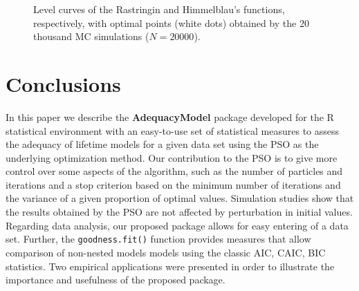 \documentclass[10pt,letterpaper]{article}
\begin{document}
\begin{figure}[H]
	\centering
	
	\caption{Level curves of the Rastringin and Himmelblau's functions, respectively, with optimal points (white dots) obtained by the 20 thousand MC simulations ($N = 20000$).}
	
\end{figure}


\section{Conclusions}

In this paper we describe the \textbf{AdequacyModel} package developed for the \textsc{R} statistical environment
with an easy-to-use set of statistical measures to assess the adequacy of lifetime models for a given data set using the PSO as the underlying optimization method.
Our contribution to the PSO is to give more control over some aspects of the algorithm,
such as the number of particles and iterations and a stop criterion based on the minimum number of iterations
and the variance of a given proportion of optimal values.
Simulation studies show that the results obtained by the PSO are not affected by perturbation in initial values.
Regarding data analysis, our proposed package allows for easy entering of a data set.
Further, the \texttt{goodness.fit()} function provides measures that allow comparison of non-nested models models using the classic AIC, CAIC, BIC statistics.
Two empirical applications were presented in order to illustrate the importance and usefulness of the proposed package.
\end{document}
